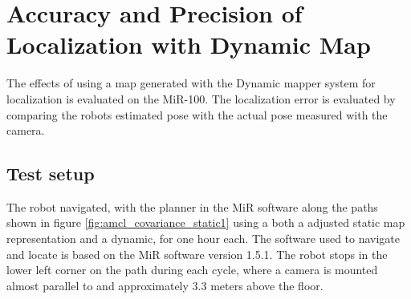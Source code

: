 \section{Accuracy and Precision of Localization with Dynamic Map}
The effects of using a map generated with the Dynamic mapper system for localization is evaluated on the MiR-100.
The localization error is evaluated by comparing the robots estimated pose with the actual pose measured with the camera. 

\subsection{Test setup} 
The robot navigated, with the planner in the MiR software along the paths shown in figure  \ref{fig:amcl_covariance_static1} using a both a adjusted static map representation and a dynamic, for one hour each.
The software used to navigate and locate is based on the MiR software version 1.5.1. 
The robot stops in the lower left corner on the path during each cycle, where a camera is mounted almost parallel to and approximately $3.3$ meters above the floor.

